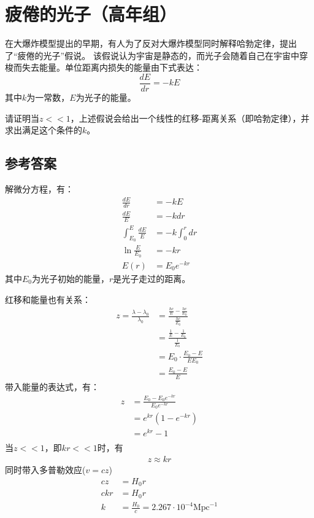 \documentclass[UTF8]{ctexart}
\numberwithin{equation}{section}
\begin{document}
\section{疲倦的光子（高年组）}
在大爆炸模型提出的早期，有人为了反对大爆炸模型同时解释哈勃定律，提出了“疲倦的光子”假说。
该假说认为宇宙是静态的，而光子会随着自己在宇宙中穿梭而失去能量。单位距离内损失的能量由下式表达：
\[
\frac{dE}{dr}=-kE
\]
其中$k$为一常数，$E$为光子的能量。

请证明当$z<<1$，上述假说会给出一个线性的红移-距离关系（即哈勃定律），并求出满足这个条件的$k$。

\subsection{参考答案}
解微分方程，有：
\begin{align*}
    \frac{dE}{dr}&=-kE\\
    \frac{dE}{E}&=-k dr\\
    \int_{E_0}^{E} \frac{dE}{E}&= -k \int_{0}^{r} dr\\
    \ln \frac{E}{E_0} &= -kr\\
    E(r) &= E_0 e^{-kr}
\end{align*}
其中$E_0$为光子初始的能量，$r$是光子走过的距离。

红移和能量也有关系：
\begin{align*}
    z = \frac{\lambda - \lambda_0}{\lambda_0} &= \frac{\frac{hc}{E}-\frac{hc}{E_0}}{\frac{hc}{E_0}}\\
    &= \frac{\frac{1}{E}-\frac{1}{E_0}}{\frac{1}{E_0}}\\
    &= E_0\cdot\frac{E_0-E}{EE_0}\\
    &= \frac{E_0 - E}{E}
\end{align*}
带入能量的表达式，有：
\begin{align*}
    z &= \frac{E_0 - E_0 e^{-kr}}{E_0 e^{-kr}}\\
    &= e^{kr}\left(1-e^{-kr}\right)\\
    &= e^{kr} - 1\\
\end{align*}
当$z<<1$，即$kr<<1$时，有
\begin{align*}
    z \approx kr
\end{align*}
同时带入多普勒效应($v = cz$)
\begin{align*}
    cz &= H_0 r\\
    c kr & = H_0 r\\
    k &= \frac{H_0}{c} = 2.267\cdot 10^{-4} \text{Mpc}^{-1}
\end{align*}
\end{document}
